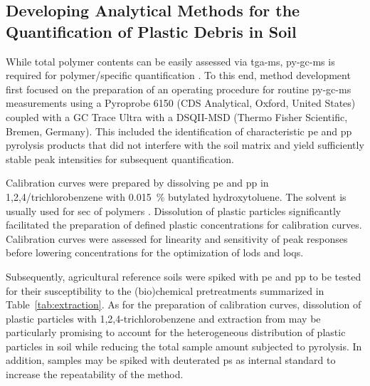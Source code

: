 \documentclass[justified,a4paper,
	nofonts,
	nobib
]{tufte-handout}
\begin{document}
\subsection{Developing Analytical Methods for the Quantification of Plastic Debris in Soil}\label{sec:methods-development}


While total polymer contents can be easily assessed via \ac{tga-ms}, \ac{py-gc-ms} is required for polymer\-/specific quantification \citep{BeckerQuantification2020}. To this end, method development first focused on the preparation of an operating procedure for routine \ac{py-gc-ms} measurements using a Pyroprobe 6150 (CDS Analytical, Oxford, United States) coupled with a GC Trace Ultra with a DSQII-MSD (Thermo Fisher Scientific, Bremen, Germany). This included the identification of characteristic \ac{pe} and \ac{pp} pyrolysis products that did not interfere with the soil matrix and yield sufficiently stable peak intensities for subsequent quantification.

Calibration curves were prepared by dissolving \ac{pe} and \ac{pp} in 1,2,4\-/trichlorobenzene with \SI{0.015}{\percent} butylated hydroxytoluene. The solvent is usually used for \ac{sec} of polymers \citep{BivensPolymertoSolvent2016}. Dissolution of plastic particles significantly facilitated the preparation of defined plastic concentrations for calibration curves. Calibration curves were assessed for linearity and sensitivity of peak responses before lowering concentrations for the optimization of \acp{lod} and \acp{loq}.

Subsequently, agricultural reference soils were spiked with \ac{pe} and \ac{pp} to be tested for their susceptibility to the (bio)\-chemical pretreatments summarized in Table~\ref{tab:extraction}. As for the preparation of calibration curves, dissolution of plastic particles with 1,2,4-trichlorobenzene \citep{BivensPolymertoSolvent2016} and extraction from may be particularly promising to account for the heterogeneous distribution of plastic particles in soil while reducing the total sample amount subjected to pyrolysis. In addition, samples may be spiked with deuterated \ac{ps} as internal standard to increase the repeatability of the method.
\end{document}
